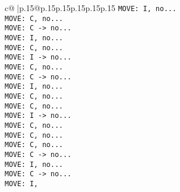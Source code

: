 \documentclass{article}
\begin{document}
{\begin{supertabular}{c@{$\;$}|p{.15\linewidth}@{}p{.15\linewidth}p{.15\linewidth}p{.15\linewidth}p{.15\linewidth}p{.15\linewidth}}
{{{\tt  MOVE: I, no...\\ \tt  MOVE: C, no...\\ \tt  MOVE: C -> no...\\ \tt  MOVE: I, no...\\ \tt  MOVE: C, no...\\ \tt  MOVE: I -> no...\\ \tt  MOVE: C, no...\\ \tt  MOVE: C -> no...\\ \tt  MOVE: I, no...\\ \tt  MOVE: C, no...\\ \tt  MOVE: C, no...\\ \tt  MOVE: I -> no...\\ \tt  MOVE: C, no...\\ \tt  MOVE: C, no...\\ \tt  MOVE: C, no...\\ \tt  MOVE: C -> no...\\ \tt  MOVE: I, no...\\ \tt  MOVE: C -> no...\\ \tt  MOVE: I,}}}
\end{supertabular}}
\end{document}
